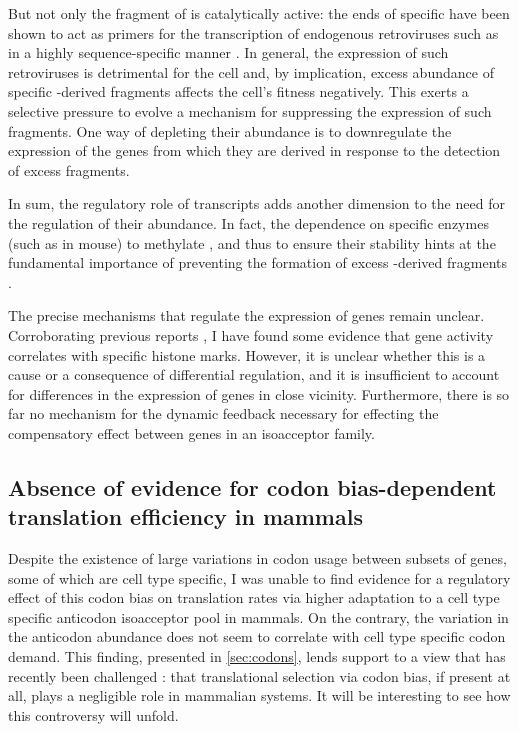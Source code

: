 But not only the \fivep fragment of \trna[s] is catalytically active: the
\threep ends of specific \trna[s] have been shown to act as primers for the
transcription of endogenous retroviruses such as \hivi in a highly
sequence-specific manner \citep{Litvak:1994}. In general, the expression of such
retroviruses is detrimental for the cell and, by implication, excess abundance
of specific \trna-derived fragments affects the cell’s fitness negatively. This
exerts a selective pressure to evolve a mechanism for suppressing the expression
of such fragments. One way of depleting their abundance is to downregulate the
expression of the \trna genes from which they are derived in response to the
detection of excess \trna fragments.

In sum, the regulatory role of \trna transcripts adds another dimension to the
need for the regulation of their abundance. In fact, the dependence on specific
enzymes (such as  in mouse) to methylate \trna[s], and thus
to ensure their stability hints at the fundamental importance of preventing the
formation of excess \trna-derived fragments \citep{Blanco:2014}.

The precise mechanisms that regulate the expression of \trna genes remain
unclear. Corroborating previous reports \citep{Oler:2010}, I have found some
evidence that \trna gene activity correlates with specific histone marks.
However, it is unclear whether this is a cause or a consequence of differential
regulation, and it is insufficient to account for differences in the expression
of \trna genes in close vicinity. Furthermore, there is so far no mechanism for
the dynamic feedback necessary for effecting the compensatory effect between
genes in an isoacceptor family.

\subsection{Absence of evidence for codon bias-dependent translation efficiency in mammals}

Despite the existence of large variations in codon usage between subsets of
genes, some of which are cell type specific, I was unable to find evidence for a
regulatory effect of this codon bias on translation rates via higher adaptation
to a cell type specific \trna anticodon isoacceptor pool in mammals. On the
contrary, the variation in the \trna anticodon abundance does not seem to
correlate with cell type specific codon demand. This finding, presented in
\cref{sec:codons}, lends support to a view that has recently been challenged
\citep{Gingold:2014,Wilusz:2015}: that translational selection via codon bias,
if present at all, plays a negligible role in mammalian systems. It will be
interesting to see how this controversy will unfold.

